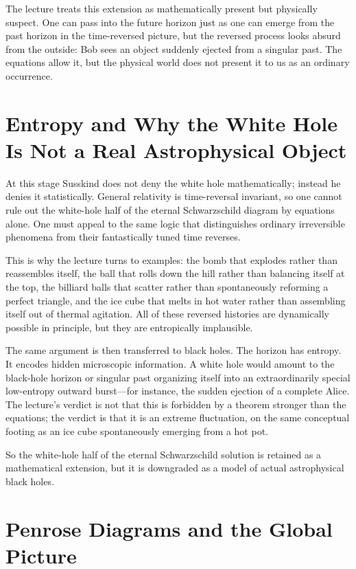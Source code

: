 The lecture treats this extension as mathematically present but physically suspect. One can pass into the future horizon just as one can emerge from the past horizon in the time-reversed picture, but the reversed process looks absurd from the outside: Bob sees an object suddenly ejected from a singular past. The equations allow it, but the physical world does not present it to us as an ordinary occurrence.

\section{Entropy and Why the White Hole Is Not a Real Astrophysical Object}

At this stage Susskind does not deny the white hole mathematically; instead he denies it statistically. General relativity is time-reversal invariant, so one cannot rule out the white-hole half of the eternal Schwarzschild diagram by equations alone. One must appeal to the same logic that distinguishes ordinary irreversible phenomena from their fantastically tuned time reverses.

This is why the lecture turns to examples: the bomb that explodes rather than reassembles itself, the ball that rolls down the hill rather than balancing itself at the top, the billiard balls that scatter rather than spontaneously reforming a perfect triangle, and the ice cube that melts in hot water rather than assembling itself out of thermal agitation. All of these reversed histories are dynamically possible in principle, but they are entropically implausible.

The same argument is then transferred to black holes. The horizon has entropy. It encodes hidden microscopic information. A white hole would amount to the black-hole horizon or singular past organizing itself into an extraordinarily special low-entropy outward burst---for instance, the sudden ejection of a complete Alice. The lecture's verdict is not that this is forbidden by a theorem stronger than the equations; the verdict is that it is an extreme fluctuation, on the same conceptual footing as an ice cube spontaneously emerging from a hot pot.

So the white-hole half of the eternal Schwarzschild solution is retained as a mathematical extension, but it is downgraded as a model of actual astrophysical black holes.

\section{Penrose Diagrams and the Global Picture}

